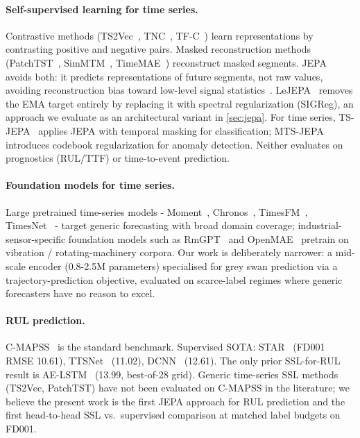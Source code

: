 \documentclass{article}
\begin{document}
\paragraph{Self-supervised learning for time series.}
Contrastive methods (TS2Vec~\citep{yue2022ts2vec}, TNC~\citep{tonekaboni2021tnc}, TF-C~\citep{zhang2022tfc}) learn representations by contrasting positive and negative pairs.
Masked reconstruction methods (PatchTST~\citep{nie2023patchtst}, SimMTM~\citep{dong2023simmtm}, TimeMAE~\citep{cheng2023timemae}) reconstruct masked segments.
JEPA avoids both: it predicts representations of future segments, not raw values, avoiding reconstruction bias toward low-level signal statistics~\citep{assran2023ijepa,bardes2024vjepa}. LeJEPA~\citep{balestriero2025lejepa} removes the EMA target entirely by replacing it with spectral regularization (SIGReg), an approach we evaluate as an architectural variant in \cref{sec:jepa}.
For time series, TS-JEPA~\citep{tsjepa2024} applies JEPA with temporal masking for classification; MTS-JEPA~\citep{mtsjepa2026} introduces codebook regularization for anomaly detection. Neither evaluates on prognostics (RUL/TTF) or time-to-event prediction.

\paragraph{Foundation models for time series.}
Large pretrained time-series models - Moment~\citep{goswami2024moment}, Chronos~\citep{ansari2024chronos}, TimesFM~\citep{das2024timesfm}, TimesNet~\citep{wu2023timesnet} - target generic forecasting with broad domain coverage; industrial-sensor-specific foundation models such as RmGPT~\citep{wang2025rmgpt} and OpenMAE~\citep{openMAE2025} pretrain on vibration / rotating-machinery corpora. Our work is deliberately narrower: a mid-scale encoder (0.8-2.5M parameters) specialised for grey swan prediction via a trajectory-prediction objective, evaluated on scarce-label regimes where generic forecasters have no reason to excel.

\paragraph{RUL prediction.}
C-MAPSS~\citep{saxena2008cmapss} is the standard benchmark. Supervised SOTA: STAR~\citep{fan2024star} (FD001 RMSE 10.61), TTSNet~\citep{ttsnet2025} (11.02), DCNN~\citep{li2018dcnn} (12.61). The only prior SSL-for-RUL result is AE-LSTM~\citep{lecam2025aelstm} (13.99, best-of-28 grid). Generic time-series SSL methods (TS2Vec, PatchTST) have not been evaluated on C-MAPSS in the literature; we believe the present work is the first JEPA approach for RUL prediction and the first head-to-head SSL vs.\ supervised comparison at matched label budgets on FD001.
\end{document}

